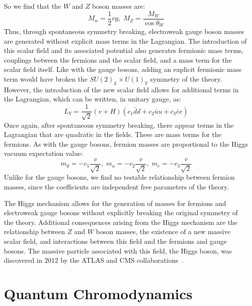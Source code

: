 So we find that the $W$ and $Z$ boson masses are:
\begin{equation}\label{eq:wz_masses}
    M_w = \frac{1}{2}vg,\; M_Z = \frac{M_W}{\cos{\theta_W}}
\end{equation}
Thus, through spontaneous symmetry breaking, electroweak gauge boson masses are generated without explicit mass terms in the Lagrangian.
The introduction of this scalar field and its associated potential also generates fermionic mass terms, couplings between the fermions and the scalar field, and a mass term for the scalar field itself.
Like with the gauge bosons, adding an explicit fermionic mass term would have broken the $SU(2)_L \times U(1)_Y$ symmetry of the theory.
However, the introduction of the new scalar field allows for additional terms in the Lagrangian, which can be written, in unitary gauge, as:
\begin{equation}\label{ew:yukawa_lagrangian}
    L_Y = \frac{1}{\sqrt{2}}\left(v+H\right)\left(c_{1}\bar{d}d+c_2\bar{u}u+c_3\bar{e}e\right)
\end{equation}
Once again, after spontaneous symmetry breaking, there appear terms in the Lagrangian that are quadratic in the fields.
These are mass terms for the fermions.
As with the gauge bosons, fermion masses are proportional to the Higgs vacuum expectation value:
\begin{equation}\label{ew:fermion_masses}
    m_d = -c_1\frac{v}{\sqrt{2}},\; m_u = -c_2\frac{v}{\sqrt{2}},\; m_e = -c_3\frac{v}{\sqrt{2}}
\end{equation}
Unlike for the gauge bosons, we find no testable relationship between fermion masses, since the coefficients are independent free parameters of the theory.

The Higgs mechanism allows for the generation of masses for fermions and electroweak gauge bosons without explicitly breaking the original symmetry of the theory.
Additional consequences arising from the Higgs mechanism are the relationship between $Z$ and $W$ boson masses, the existence of a new massive scalar field, and interactions between this field and the fermions and gauge bosons.
The massive particle associated with this field, the Higgs boson, was discovered in 2012 by the ATLAS and CMS collaborations~\cite{sm-higgs-discovery-atlas,sm-higgs-discovery-cms}.

\section{Quantum Chromodynamics}\label{sec:sm_qcd}


